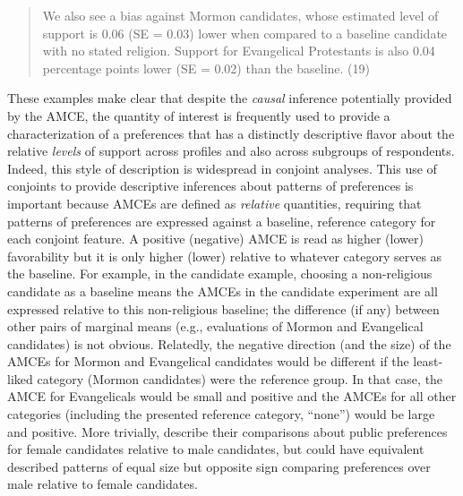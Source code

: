 \documentclass[a4paper,12pt]{article}\usepackage[]{graphicx}\usepackage[]{color}
\begin{document}
\begin{quote}
We also see a bias against Mormon candidates, whose estimated level of support is 0.06 (SE = 0.03) lower when compared to a baseline candidate with no stated religion. Support for Evangelical Protestants is also 0.04 percentage points lower (SE = 0.02) than the baseline. (19)
\end{quote}

\noindent These examples make clear that despite the \textit{causal} inference potentially provided by the AMCE, the quantity of interest is frequently used to provide a characterization of a preferences that has a distinctly descriptive flavor about the relative \textit{levels} of support across profiles and also across subgroups of respondents. Indeed, this style of description is widespread in conjoint analyses. This use of conjoints to provide descriptive inferences about patterns of preferences is important because AMCEs are defined as \textit{relative} quantities, requiring that patterns of preferences are expressed against a baseline, reference category for each conjoint feature. A positive (negative) AMCE is read as higher (lower) favorability but it is only higher (lower) relative to whatever category serves as the baseline. For example, in the \citeauthor{HainmuellerHopkinsYamamoto2014} candidate example, choosing a non-religious candidate as a baseline means the AMCEs in the candidate experiment are all expressed relative to this non-religious baseline; the difference (if any) between other pairs of marginal means (e.g., evaluations of Mormon and Evangelical candidates) is not obvious. Relatedly, the negative direction (and the size) of the AMCEs for Mormon and Evangelical candidates would be different if the least-liked category (Mormon candidates) were the reference group. In that case, the AMCE for Evangelicals would be small and positive and the AMCEs for all other categories (including the presented reference category, ``none'') would be large and positive. More trivially, \citet{TeeleKallaRosenbluth2018} describe their comparisons about public preferences for female candidates relative to male candidates, but could have equivalent described patterns of equal size but opposite sign comparing preferences over male relative to female candidates.
\end{document}
